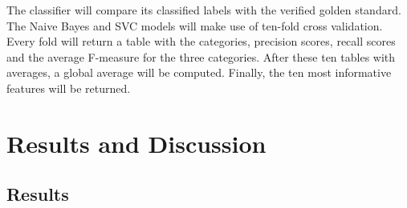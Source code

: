\documentclass[
10pt, %
a4paper, %
oneside, %
headinclude,footinclude, %
] {book}%
\begin{document}
The classifier will compare its classified labels with the verified golden standard. The Naive Bayes and SVC models will make use of ten-fold cross validation. Every fold will return a table with the categories, precision scores, recall scores and the average F-measure for the three categories. After these ten tables with averages, a global average will be computed. Finally, the ten most informative features will be returned.

\chapter{Results and Discussion}

\section{Results}
\end{document}
